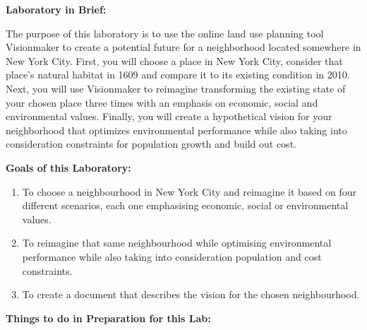 \documentclass{article}
\begin{document}
\newpage


\large{\textbf{Laboratory in Brief:}}

\vspace{4mm}

\setlength{\leftskip}{1cm}

\setlength{\parindent}{0cm}

The purpose of this laboratory is to use the online land use planning tool Visionmaker to create a potential future for a neighborhood located somewhere in New York City.  First, you will choose a place in New York City, consider that place's natural habitat in 1609 and compare it to its existing condition in 2010.  Next, you will use Visionmaker  to reimagine transforming the existing state of your chosen place three times with an emphasis on economic, social and environmental values.  Finally, you will create a hypothetical vision for your neighborhood that optimizes environmental performance while also taking into consideration constraints for population growth and build out cost.

\vspace{4mm}

\setlength{\leftskip}{0cm}

\large{\textbf{Goals of this Laboratory:}}

\begin{enumerate}[leftmargin=15mm]

\item To choose a neighbourhood in New York City and reimagine it based on four different scenarios, each one emphasising economic, social or environmental values.

\item To reimagine that same neighbourhood while optimising environmental performance while also taking into consideration population and cost constraints.

\item To create a document that describes the vision for the chosen neighbourhood.

\end{enumerate}


\large{\textbf{Things to do in Preparation for this Lab:}}
\end{document}
